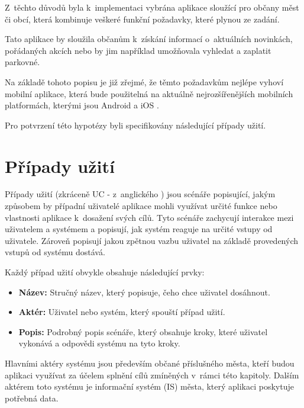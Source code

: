 Z~těchto důvodů byla k~implementaci vybrána aplikace sloužící pro občany měst či obcí, která kombinuje veškeré funkční požadavky, které plynou ze zadání.

Tato aplikace by sloužila občanům k~získání informací o~aktuálních novinkách, pořádaných akcích nebo by jim například umožňovala vyhledat a zaplatit parkovné.

\medskip

Na základě tohoto popisu je již zřejmé, že těmto požadavkům nejlépe vyhoví mobilní aplikace, která bude použitelná na aktuálně nejrozšířenějších
mobilních platformách, kterými jsou Android a iOS \cite{iosAndroid}. 


Pro potvrzení této hypotézy byli specifikovány následující případy užití.

\section{Případy užití}
Případy užití  (zkráceně UC - z~anglického ) jsou scénáře popisující, jakým způsobem by případní uživatelé aplikace mohli využívat určité funkce nebo
vlastnosti aplikace k~dosažení svých cílů. \cite{figmaUseCase} Tyto scénáře zachycují interakce mezi uživatelem a systémem a popisují, jak systém reaguje na určité vstupy od 
uživatele. Zároveň popisují jakou zpětnou vazbu uživatel na základě provedených vstupů od systému dostává.

\medskip

Každý případ užití obvykle obsahuje následující prvky:

\begin{itemize}
  \item \textbf{Název:} Stručný název, který popisuje, čeho chce uživatel dosáhnout.
  \item \textbf{Aktér:} Uživatel nebo systém, který spouští případ užití.
  \item \textbf{Popis:} Podrobný popis scénáře, který obsahuje kroky, které uživatel vykonává a odpovědi systému na tyto kroky.
\end{itemize}

Hlavními aktéry systému jsou především občané příslušného města, kteří budou aplikaci využívat za účelem splnění cílů 
zmíněných v~rámci této kapitoly. 
Dalším aktérem toto systému je informační systém (IS) města, který aplikaci poskytuje potřebná data. 

